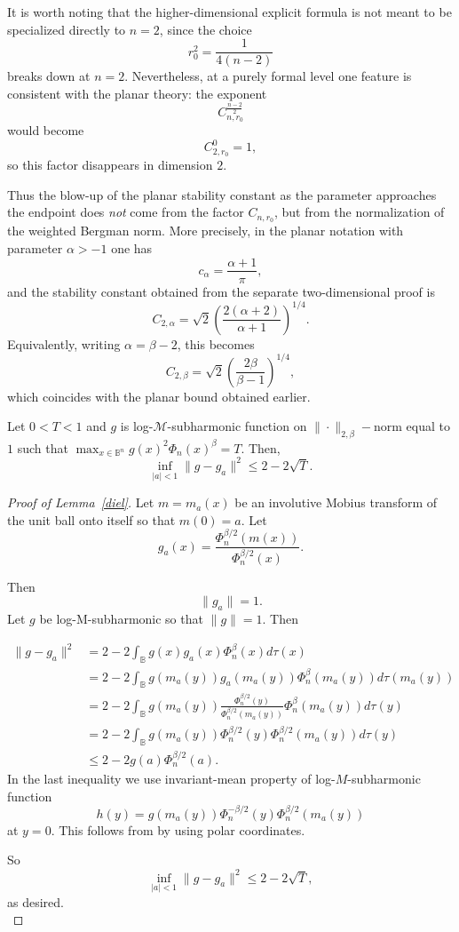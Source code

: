 \begin{numrem}
It is worth noting that the higher-dimensional explicit formula is not meant to be specialized directly to $n=2$, since the choice
\[
r_0^2=\frac{1}{4(n-2)}
\]
breaks down at $n=2$. Nevertheless, at a purely formal level one feature is consistent with the planar theory: the exponent
\[
C_{n,r_0}^{\frac{n-2}{2}}
\]
would become
\[
C_{2,r_0}^{0}=1,
\]
so this factor disappears in dimension $2$.

Thus the blow-up of the planar stability constant as the parameter approaches the endpoint does \emph{not} come from the factor $C_{n,r_0}$, but from the normalization of the weighted Bergman norm. More precisely, in the planar notation with parameter $\alpha>-1$ one has
\[
c_\alpha=\frac{\alpha+1}{\pi},
\]
and the stability constant obtained from the separate two-dimensional proof is
\[
C_{2,\alpha}
=
\sqrt2\left(\frac{2(\alpha+2)}{\alpha+1}\right)^{1/4}.
\]
Equivalently, writing $\alpha=\beta-2$, this becomes
\[
C_{2,\beta}
=
\sqrt2\left(\frac{2\beta}{\beta-1}\right)^{1/4},
\]
which coincides with the planar bound obtained earlier.
\end{numrem}
\begin{numlemma}\label{diel}
Let $0<T<1$ and $g$ is log-$\mathcal{M}$-subharmonic function on $\|\cdot\|_{2,\beta}-$norm equal to $1$ such that
$\max_{x \in \mathbb{B}^n}g(x)^2\Phi_n(x)^{{\beta}}=T$. Then,
 $$\inf_{|a|<1}\|g-g_a\|^2\le 2-2 \sqrt{T}.$$
\end{numlemma}
\begin{proof}[Proof of Lemma~\ref{diel}]
Let $m=m_a(x)$ be an involutive Mobius transform of the unit ball onto itself so that $m(0)=a$. Let $$g_a(x)=\frac{\Phi^{\beta/2}_n(m(x))}{{\Phi^{\beta/2}_n(x)}}. $$

Then $$\|g_a\|=1.$$ Let $g$ be log-M-subharmonic so that $\|g\|=1$. Then

\[\begin{split}\|g-g_a\|^2 &= 2 -2\int_{\mathbb{B}} g(x) g_a(x) \Phi_n^\beta(x) d\tau(x)
\\&=2 -2\int_{\mathbb{B}} g(m_a(y)) g_a(m_a(y)) \Phi_n^\beta(m_a(y)) d\tau(m_a(y))
\\&=2 -2\int_{\mathbb{B}} g(m_a(y)) \frac{\Phi^{\beta/2}_n(y)}{{\Phi^{\beta/2}_n(m_a(y))}} \Phi_n^\beta(m_a(y)) d\tau(y)
\\&=2 -2\int_{\mathbb{B}} g(m_a(y)) {\Phi^{\beta/2}_n(y)}\Phi_n^{\beta/2}(m_a(y)) d\tau(y)
\\&\le 2-2 g(a) \Phi_n^{\beta/2}(a).\end{split}\]
In the last inequality we use invariant-mean property of log-$M$-subharmonic function $$h(y)=g(m_a(y)) {\Phi^{-\beta/2}_n(y)}\Phi_n^{\beta/2}(m_a(y))$$ at $y=0$. This follows from \cite[Corollary~4.13]{stoll} by using polar coordinates.

So $$\inf_{|a|<1}\|g-g_a\|^2\le 2-2 \sqrt{T},$$ as desired.\\
\end{proof}

